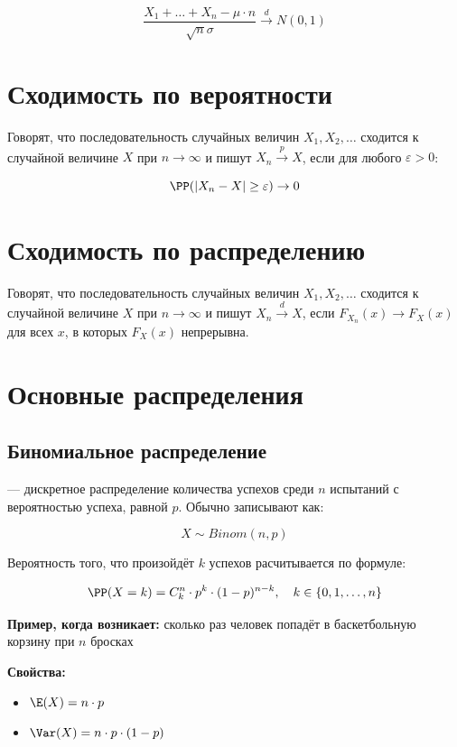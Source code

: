 \documentclass[12pt, a4paper, oneside]{article}
\begin{document}
$$
\frac{X_1 + \ldots +  X_n - \mu \cdot n}{\sqrt{n} \sigma } \overset{d}{\to} N(0,1)
$$

\section{Сходимость по вероятности}

Говорят, что последовательность случайных величин $X_1, X_2, \ldots$ сходится к случайной величине $X$ при $n \to \infty$  и пишут $X_n \overset{p}{\to} X$, если для любого  $\varepsilon > 0$:

$$
\PP(|X_n - X| \ge \varepsilon) \to 0
$$

\section{Сходимость по распределению}

Говорят, что последовательность случайных величин $X_1, X_2, \ldots$ сходится к случайной величине $X$ при $n \to \infty$  и пишут $X_n \overset{d}{\to} X$, если $F_{X_n}(x) \to F_X(x)$ для всех $x$, в которых $F_X(x)$ непрерывна.


\section{Основные распределения}

\subsection*{Биномиальное распределение}

 --- дискретное распределение количества успехов среди $n$ испытаний с вероятностью успеха, равной $p$. Обычно записывают как:

$$
X \sim Binom(n, p)
$$

Вероятность того, что произойдёт $k$ успехов расчитывается по формуле: 

$$
\PP(X = k) = {C}^n_k \cdot p^k \cdot (1 - p)^{n - k}, \quad k \in \{0, 1, \ldots, n\}
$$

\textbf{Пример, когда возникает:} сколько раз человек попадёт в баскетбольную корзину при $n$ бросках 

\textbf{Свойства:}

\begin{itemize} 
\item $\E(X) = n \cdot p$
\item $\Var(X) = n \cdot p \cdot (1 - p)$
\end{itemize} 
\end{document}

